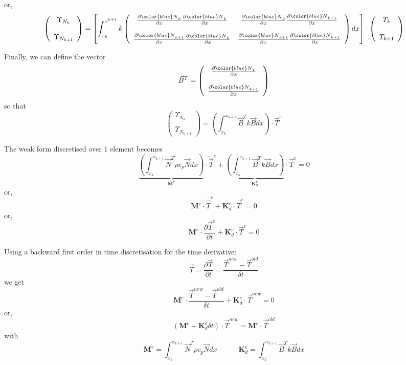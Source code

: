 or,
\[
\left(
\begin{array}{cc}
 {\Upsilon}_{N_k} \\ \\ {\Upsilon}_{N_{k+1}}
\end{array}
\right)
=
\left[
\int_{x_k}^{x^{k+1}}
k
\left(
\begin{array}{cc}
\frac{\partial {\color{blue}N}_k}{\partial x}  \frac{\partial  {\color{blue}N}_{k} } {\partial x}   & 
\frac{\partial {\color{blue}N}_k}{\partial x}  \frac{\partial  {\color{blue}N}_{k+1} } {\partial x}  
\\ \\
\frac{\partial {\color{blue}N}_{k+1}}{\partial x}  \frac{\partial  {\color{blue}N}_{k} } {\partial x}   & 
\frac{\partial {\color{blue}N}_{k+1}}{\partial x}  \frac{\partial  {\color{blue}N}_{k+1} } {\partial x}  
\end{array}
\right)
dx
\right]
\cdot
\left(
\begin{array}{c}
T_k \\ \\ T_{k+1}
\end{array}
\right)
\]

Finally, we can define the vector 
\[
{\vec B}^T=
\left(
\begin{array}{cc}
 \frac{\partial {\color{blue}N}_k}{\partial x}   \\ \\
 \frac{\partial {\color{blue}N}_{k+1}}{\partial x}
\end{array}
\right)
\]
so that 
\[
\left(
\begin{array}{cc}
 {\Upsilon}_{N_k} \\ \\ {\Upsilon}_{N_{k+1}}
\end{array}
\right)
=
\left( \int_{x_k}^{x_{k+1}}   {\vec B}^T k {\vec B} dx  \right) \cdot {\vec T}^e
\]

The weak form discretised over 1 element becomes
\[
\underbrace{\left( \int_{x_k}^{x_{k+1}}   {\vec N}^T \rho c_p {\vec N} dx  \right) }_{\bm M^e} \cdot \dot{\vec T}^e
+
\underbrace{\left( \int_{x_k}^{x_{k+1}}   {\vec B}^T k {\vec B} dx  \right)}_{{\bm K}_d^e} \cdot {\vec T}^e
=0
\]
or,
\[
\boxed{
{\bm M}^e \cdot \dot{\vec T}^e + {\bm K}_d^e \cdot {\vec T}^e = 0
}
\]
or,
\[
\boxed{
{\bm M}^e \cdot \frac{\partial {\vec T}^e}{\partial t} + {\bm K}_d^e \cdot {\vec T}^e = 0
}
\]

Using a backward first order in time discretisation for the time derivative:
\[
\dot{\vec T}= \frac{\partial {\vec T}}{\partial t} = \frac{{\vec T}^{new}-{\vec T}^{old}}{\delta t}
\]
we get
\[
{\bm M}^e \cdot \frac{{\vec T}^{new}-{\vec T}^{old}}{\delta t} + {\bm K}_d^e \cdot {\vec T}^{new} = 0
\]
or, 
\[
\boxed{
( {\bm M}^e +  {\bm K}_d^e  \delta t ) \cdot {\vec T}^{new} =  {\bm M}^e \cdot  {\vec T}^{old}
}
\]
with 
\[
{\bm M}^e=  \int_{x_k}^{x_{k+1}}   {\vec N}^T \rho c_p {\vec N} dx  
\quad\quad\quad
{\bm K}_d^e =
 \int_{x_k}^{x_{k+1}}   {\vec B}^T k {\vec B} dx 
\]

